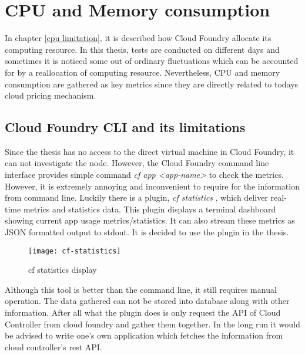 \section{CPU and Memory consumption}
In chapter \ref{cpu limitation}, it is described how Cloud Foundry allocate its computing resource. In this thesis, tests are conducted on different days and sometimes it is noticed some out of ordinary fluctuations which can be accounted for by a reallocation of computing resource. Nevertheless, CPU and memory consumption are gathered as key metrics since they are directly related to todays cloud pricing mechanism.
\subsection{Cloud Foundry CLI and its limitations}
Since the thesis has no access to the direct virtual machine in Cloud Foundry, it can not investigate the node. However, the Cloud Foundry command line interface provides simple command \textit{cf app <app-name>} to check the metrics. However, it is extremely annoying and inconvenient to require for the information from command line. Luckily there is a plugin, \textit{cf statistics} \citep{cfstatistics}, which deliver real-time metrics and statistics data. This plugin displays a terminal dashboard showing current app usage metrics/statistics. It can also stream these metrics as JSON formatted output to stdout. It is decided to use the plugin in the thesis. \\
\begin{figure}[h]
	\centering
	\texttt{[image: cf-statistics]}
	\caption{cf statistics display}
	\label{cf-statistics}
\end{figure}
Although this tool is better than the command line, it still requires manual operation. The data gathered can not be stored into database along with other information. After all what the plugin does is only request the API of Cloud Controller  \citep{cloudcontroller}from cloud foundry and gather them together. In the long run it would be advised to write one's own application which fetches the information from cloud controller's rest API. 
